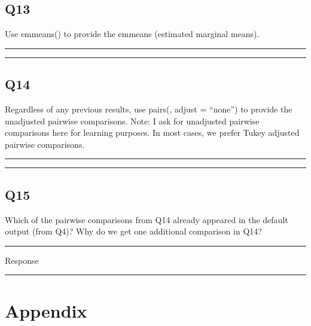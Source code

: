 \documentclass[
]{article}
\begin{document}
\hypertarget{q13}{%
\subsection{Q13}\label{q13}}

Use emmeans() to provide the emmeans (estimated marginal means).

\begin{center}\rule{0.5\linewidth}{0.5pt}\end{center}

\begin{center}\rule{0.5\linewidth}{0.5pt}\end{center}

\hypertarget{q14}{%
\subsection{Q14}\label{q14}}

Regardless of any previous results, use pairs(, adjust = ``none'') to
provide the unadjusted pairwise comparisons. Note: I ask for unadjusted
pairwise comparisons here for learning purposes. In most cases, we
prefer Tukey adjusted pairwise comparisons.

\begin{center}\rule{0.5\linewidth}{0.5pt}\end{center}

\begin{center}\rule{0.5\linewidth}{0.5pt}\end{center}

\hypertarget{q15}{%
\subsection{Q15}\label{q15}}

Which of the pairwise comparisons from Q14 already appeared in the
default output (from Q4)? Why do we get one additional comparison in
Q14?

\begin{center}\rule{0.5\linewidth}{0.5pt}\end{center}

Response

\begin{center}\rule{0.5\linewidth}{0.5pt}\end{center}

\hypertarget{appendix}{%
\section{Appendix}\label{appendix}}
\end{document}
